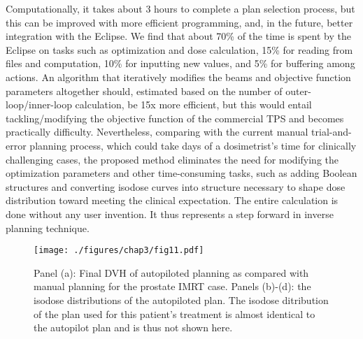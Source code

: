 Computationally, it takes about 3 hours to complete a plan selection process, but this can be improved with more efficient programming, and, in the future, better integration with the Eclipse. We find that about 70\% of the time is spent by the Eclipse on tasks such as optimization and dose calculation, 15\% for reading from files and computation, 10\% for inputting new values, and 5\% for buffering among actions.  An algorithm that iteratively modifies the beams and objective function parameters altogether should, estimated based on the number of outer-loop/inner-loop calculation, be 15x more efficient, but this would entail tackling/modifying the objective function of the commercial TPS and becomes practically difficulty. Nevertheless, comparing with the current manual trial-and-error planning process, which could take days of a dosimetrist's time for clinically challenging cases, the proposed method eliminates the need for modifying the optimization parameters and other time-consuming tasks, such as adding Boolean structures and converting isodose curves into structure necessary to shape dose distribution toward meeting the clinical expectation. The entire calculation is done without any user invention. It thus represents a step forward in inverse planning technique. 

\begin{figure}
	\centering
	\texttt{[image: ./figures/chap3/fig11.pdf]}
	\caption{Panel (a): Final DVH of autopiloted planning as compared with manual planning for the prostate IMRT case. Panels (b)-(d): the isodose distributions of the autopiloted plan. The isodose ditribution of the plan used for this patient's treatment is almost identical to the autopilot plan and is thus not shown here. 
	\label{fig3.11}}
    \end{figure}

